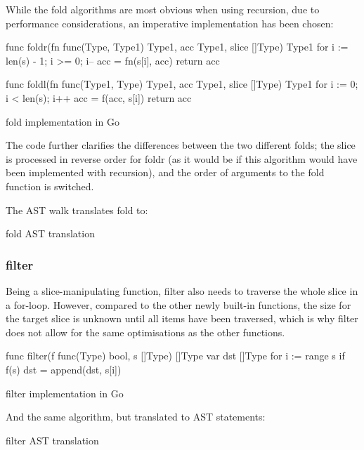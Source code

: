 While the fold algorithms are most obvious when using recursion, due to
performance considerations, an imperative implementation has been chosen:

\begin{listing}
	\begin{gocode}
func foldr(fn func(Type, Type1) Type1, acc Type1, slice []Type) Type1 {
	for i := len(s) - 1; i >= 0; i-- {
		acc = fn(s[i], acc)
	}
	return acc
}

func foldl(fn func(Type1, Type) Type1, acc Type1, slice []Type) Type1 {
	for i := 0; i < len(s); i++ {
		acc = f(acc, s[i])
	}
	return acc
}
\end{gocode}
	\caption{fold implementation in Go}
\end{listing}
The code further clarifies the differences between the two different folds;
the slice is processed in reverse order for foldr (as it would be if this
algorithm would have been implemented with recursion), and the order of
arguments to the fold function is switched.

The AST walk translates fold to:
\begin{code}
	\caption{fold AST translation\autocite{fold-walk-implementation}}
\end{code}
\subsubsection{filter}\label{ch:impl-filter}

Being a slice-manipulating function, filter also needs to traverse the whole
slice in a for-loop. However, compared to the other newly built-in functions,
the size for the target slice is unknown until all items have been traversed,
which is why filter does not allow for the same optimisations as the other
functions.

\begin{listing}
	\begin{gocode}
func filter(f func(Type) bool, s []Type) []Type {
	var dst []Type
	for i := range s {
			if f(s) {
				dst = append(dst, s[i])
			}
	}
}
	\end{gocode}
	\caption{filter implementation in Go}
\end{listing}
And the same algorithm, but translated to AST statements:

\begin{code}
	\caption{filter AST translation\autocite{filter-walk-implementation}}
\end{code}

